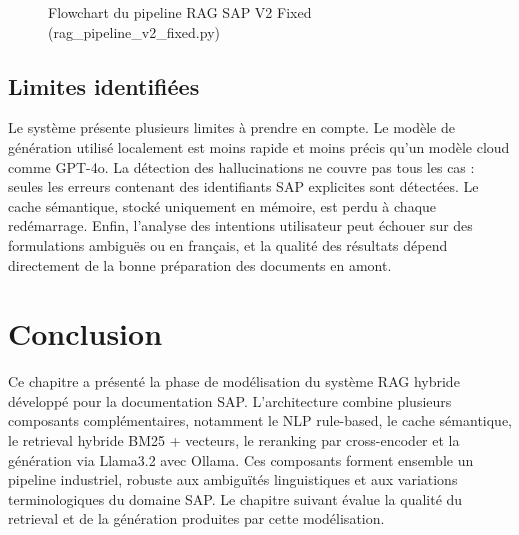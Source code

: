\begin{figure}[H]
\caption[Pipeline RAG SAP V2]{Flowchart du pipeline RAG SAP V2 Fixed (rag\_pipeline\_v2\_fixed.py)}
\label{fig:pipeline_flowchart}
\end{figure}

\subsection{Limites identifiées}

Le système présente plusieurs limites à prendre en compte. Le modèle de génération utilisé localement est moins rapide et moins précis qu’un modèle cloud comme GPT-4o. La détection des hallucinations ne couvre pas tous les cas : seules les erreurs contenant des identifiants SAP explicites sont détectées. Le cache sémantique, stocké uniquement en mémoire, est perdu à chaque redémarrage. Enfin, l’analyse des intentions utilisateur peut échouer sur des formulations ambiguës ou en français, et la qualité des résultats dépend directement de la bonne préparation des documents en amont.
\section*{Conclusion }

Ce chapitre a présenté la phase de modélisation du système RAG hybride développé pour la documentation SAP. L’architecture combine plusieurs composants complémentaires, notamment le NLP rule-based, le cache sémantique, le retrieval hybride BM25 + vecteurs, le reranking par cross-encoder et la génération via Llama3.2 avec Ollama. Ces composants forment ensemble un pipeline industriel, robuste aux ambiguïtés linguistiques et aux variations terminologiques du domaine SAP. Le chapitre suivant évalue la qualité du retrieval et de la génération produites par cette modélisation.

